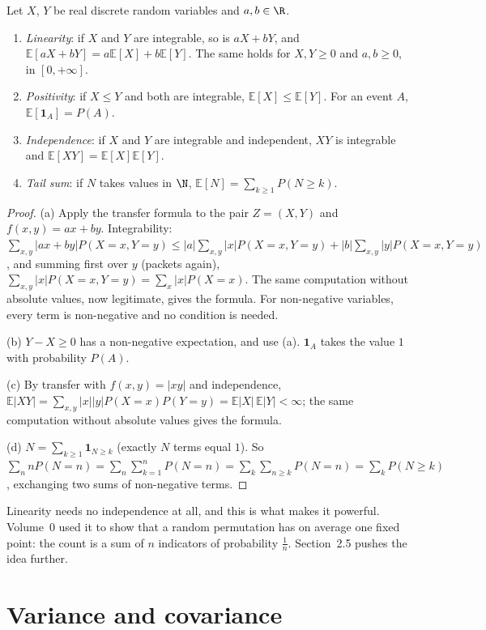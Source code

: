 \begin{theorem}\label{thm:linearity}
Let $X$, $Y$ be real discrete random variables and $a,b\in\R$.
\begin{enumerate}[label=(\alph*)]
\item \emph{Linearity}: if $X$ and $Y$ are integrable, so is $aX+bY$, and $\mathbb E[aX+bY]=a\mathbb E[X]+b\mathbb E[Y]$.
The same holds for $X,Y\ge0$ and $a,b\ge0$, in $[0,+\infty]$.
\item \emph{Positivity}: if $X\le Y$ and both are integrable, $\mathbb E[X]\le\mathbb E[Y]$. For an event $A$, $\mathbb E[\mathbf
1_A]=P(A)$.
\item \emph{Independence}: if $X$ and $Y$ are integrable and independent, $XY$ is integrable and
$\mathbb E[XY]=\mathbb E[X]\mathbb E[Y]$.
\item \emph{Tail sum}: if $N$ takes values in $\N$, $\mathbb E[N]=\sum_{k\ge1}P(N\ge k)$.
\end{enumerate}
\end{theorem}
\begin{proof}
(a) Apply the transfer formula to the pair $Z=(X,Y)$ and $f(x,y)=ax+by$. Integrability:
$\sum_{x,y}|ax+by|P(X=x,Y=y)\le|a|\sum_{x,y}|x|P(X=x,Y=y)+|b|\sum_{x,y}|y|P(X=x,Y=y)$, and summing first over $y$
(packets again), $\sum_{x,y}|x|P(X=x,Y=y)=\sum_x|x|P(X=x)$. The same computation without absolute values, now
legitimate, gives the formula. For non-negative variables, every term is non-negative and no condition is needed.

(b) $Y-X\ge0$ has a non-negative expectation, and use (a). $\mathbf 1_A$ takes the value $1$ with probability $P(A)$.

(c) By transfer with $f(x,y)=|xy|$ and independence,
$\mathbb E|XY|=\sum_{x,y}|x||y|P(X=x)P(Y=y)=\mathbb E|X|\,\mathbb E|Y|<\infty$; the same computation without absolute values gives
the formula.

(d) $N=\sum_{k\ge1}\mathbf 1_{N\ge k}$ (exactly $N$ terms equal $1$). So $\sum_nnP(N=n)=\sum_n\sum_{k=1}^nP(N=n)=
\sum_k\sum_{n\ge k}P(N=n)=\sum_kP(N\ge k)$, exchanging two sums of non-negative terms.
\end{proof}

Linearity needs no independence at all, and this is what makes it powerful. Volume~0 used it to show that a random
permutation has on average one fixed point: the count is a sum of $n$ indicators of probability $\frac1n$. Section~2.5
pushes the idea further.

\section{Variance and covariance}

